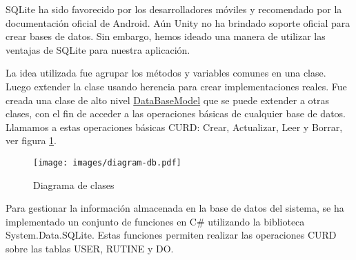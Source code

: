 \vspace{10pt}
SQLite ha sido favorecido por los desarrolladores móviles y recomendado por la documentación oficial de Android. Aún  
Unity no ha brindado soporte oficial para crear bases de datos. Sin embargo, hemos ideado una manera de utilizar las 
ventajas de SQLite para nuestra aplicación. 

\vspace{10pt}
La idea utilizada fue agrupar los métodos y variables comunes en una clase. Luego extender la clase usando herencia para 
crear implementaciones reales. Fue creada una clase de alto nivel \underline{DataBaseModel} que se puede extender a otras clases, con el 
fin de acceder a las operaciones básicas de cualquier base de datos. Llamamos a estas operaciones básicas CURD: Crear, 
Actualizar, Leer y Borrar, ver figura \ref{fig: diagram-db}.

\begin{figure}[ht]
    \centering
    \texttt{[image: images/diagram-db.pdf]}
    \caption{Diagrama de clases}
    \label{fig: diagram-db}
\end{figure}

Para gestionar la información almacenada en la base de datos del sistema, se ha implementado un conjunto de funciones en C\# utilizando la biblioteca System.Data.SQLite. Estas funciones permiten realizar las operaciones CURD sobre las tablas USER, RUTINE y DO.


